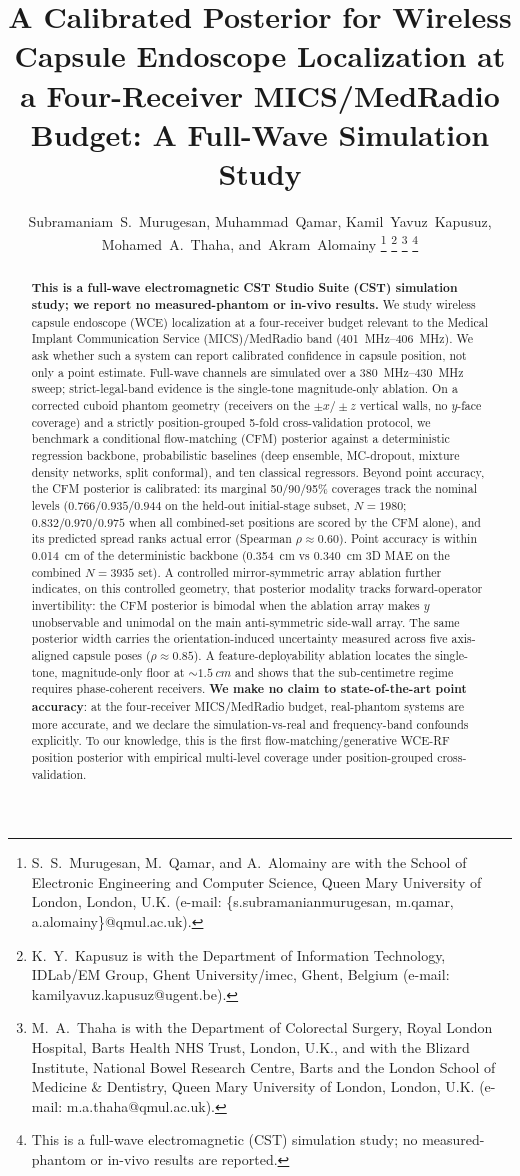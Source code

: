 \documentclass[journal]{IEEEtran}
\title{A Calibrated Posterior for Wireless Capsule Endoscope Localization at a
Four-Receiver MICS/MedRadio Budget: A Full-Wave Simulation Study}
\author{Subramaniam~S.~Murugesan,
Muhammad~Qamar,
Kamil~Yavuz~Kapusuz,
Mohamed~A.~Thaha,
and~Akram~Alomainy
\thanks{S.~S.~Murugesan, M.~Qamar, and A.~Alomainy are with the School of
Electronic Engineering and Computer Science, Queen Mary University of London,
London, U.K. (e-mail: \{s.subramanianmurugesan, m.qamar,
a.alomainy\}@qmul.ac.uk).}%
\thanks{K.~Y.~Kapusuz is with the Department of Information Technology,
IDLab/EM Group, Ghent University/imec, Ghent, Belgium
(e-mail: kamilyavuz.kapusuz@ugent.be).}%
\thanks{M.~A.~Thaha is with the Department of Colorectal Surgery, Royal London
Hospital, Barts Health NHS Trust, London, U.K., and with the Blizard Institute,
National Bowel Research Centre, Barts and the London School of Medicine \&
Dentistry, Queen Mary University of London, London, U.K.
(e-mail: m.a.thaha@qmul.ac.uk).}%
\thanks{This is a full-wave electromagnetic (CST) simulation study; no
measured-phantom or in-vivo results are reported.}}
\begin{document}
\maketitle

\begin{abstract}
\textbf{This is a full-wave electromagnetic CST Studio Suite (CST) simulation
study; we report no measured-phantom or in-vivo results.} We study wireless
capsule endoscope (WCE) localization at a four-receiver budget relevant to the
Medical Implant Communication Service (MICS)/MedRadio band
(\SIrange{401}{406}{MHz}). We ask whether such a system can report calibrated
confidence in capsule position, not only a point estimate. Full-wave channels
are simulated over a \SIrange{380}{430}{MHz} sweep; strict-legal-band evidence is
the single-tone magnitude-only ablation. On a corrected cuboid phantom geometry
(receivers on the $\pm x/\pm z$ vertical walls, no $y$-face coverage) and a
strictly position-grouped 5-fold cross-validation protocol, we benchmark a
conditional flow-matching (CFM) posterior against a deterministic regression
backbone, probabilistic baselines (deep ensemble, MC-dropout, mixture density
networks, split conformal), and ten classical regressors. Beyond point accuracy,
the CFM posterior is calibrated: its marginal 50/90/95\% coverages track the
nominal levels ($0.766/0.935/0.944$ on the held-out initial-stage subset,
$N=1980$; $0.832/0.970/0.975$ when all combined-set positions are scored by the
CFM alone), and its predicted spread ranks actual error (Spearman
$\rho\approx0.60$). Point accuracy is within \SI{0.014}{cm} of the deterministic
backbone (\SI{0.354}{cm} vs \SI{0.340}{cm} 3D MAE on the combined $N=3935$ set).
A controlled mirror-symmetric array ablation further indicates, on this
controlled geometry, that posterior modality tracks forward-operator
invertibility: the CFM posterior is bimodal when the ablation array makes $y$
unobservable and unimodal on the main anti-symmetric side-wall array. The same
posterior width carries the orientation-induced uncertainty measured across five
axis-aligned capsule poses ($\rho\approx0.85$). A feature-deployability ablation
locates the single-tone, magnitude-only floor at ${\sim}\SI{1.5}{cm}$ and shows
that the sub-centimetre regime requires phase-coherent receivers. \textbf{We
make no claim to state-of-the-art point accuracy}: at the four-receiver
MICS/MedRadio budget, real-phantom systems are more accurate, and we declare the
simulation-vs-real and frequency-band confounds explicitly. To our knowledge,
this is the first flow-matching/generative WCE-RF position posterior with
empirical multi-level coverage under position-grouped cross-validation.
\end{abstract}
\end{document}

